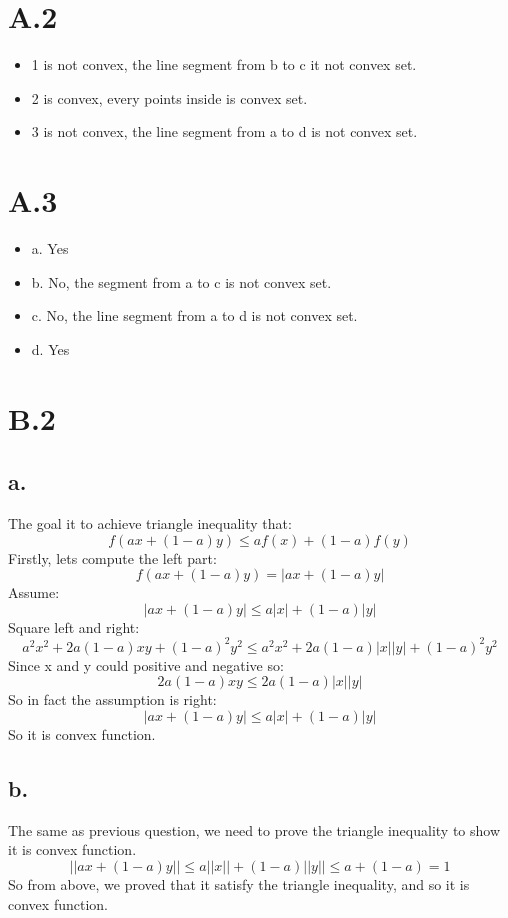 \documentclass{article}
\begin{document}
\section*{A.2}

\begin{itemize}
\item 1 is not convex, the line segment from b to c it not convex set.

\item 2 is convex, every points inside is convex set.

\item 3 is not convex, the line segment from a to d is not convex set.
\end{itemize}


\section*{A.3}

\begin{itemize}
\item a. Yes
\item b. No, the segment from a to c is not convex set.
\item c. No, the line segment from a to d is not convex set.
\item d. Yes
\end{itemize}


\section*{B.2}
\subsection*{a.}
The goal it to achieve triangle inequality that:
\[ f(ax + (1-a)y) \le af(x) + (1-a)f(y) \]
Firstly, lets compute the left part:
\[ f(ax + (1-a)y) = |ax + (1-a) y| \]
Assume:
\[ |ax + (1-a) y| \le a|x| + (1-a)|y| \]
Square left and right:
\[ a^2x^2 + 2a(1-a)xy + (1-a)^2y^2 \le a^2x^2 + 2a(1-a)|x||y| + (1-a)^2y^2\]
Since x and y could positive and negative so:
\[ 2a(1-a)xy \le  2a(1-a)|x||y| \]
So in fact the assumption is right:
\[ |ax + (1-a) y| \le a|x| + (1-a)|y| \]
So it is convex function.

\subsection*{b.}
The same as previous question, we need to prove the triangle inequality to show it is convex function.
\[ ||ax + (1-a)y|| \le a||x|| + (1-a)||y|| \le a + (1-a) = 1 \]
So from above, we proved that it satisfy the triangle inequality, and so it is convex function.
\end{document}
